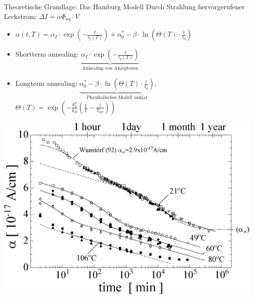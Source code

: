 \documentclass[aspectratio=43, 10pt]{beamer}
\begin{document}
\begin{frame}{Theoretische Grundlage: Das Hamburg Modell}
  Durch Strahlung hervorgerufener Leckstrom: \:$\Delta I = \alpha \Phi_{\mathrm{eq}} \cdot V $ \\
  \medskip

  \begin{itemize}
    \item $\alpha(t, T) = \alpha_I \cdot \exp{\left(-\frac{t}{\tau_{\mathrm{I}}(T)}\right)} + \alpha_{\mathrm{0}}^{*} -\beta \cdot \ln{\left(\Theta(T) \cdot \frac{t}{t_{\mathrm{0}}}\right)}$
    \medskip
    \item Shortterm annealing:\: $\underbrace{\alpha_I \cdot \exp{\left(-\frac{t}{\tau_{\mathrm{I}}(T)}\right)}}_{\text{Annealing von Akzeptoren}}$
    \item Longterm annealing:\: $\underbrace{\alpha_{\mathrm{0}}^{*} -\beta \cdot \ln{\left(\Theta(T) \cdot \frac{t}{t_{\mathrm{0}}}\right)}}_{\text{Physikalisches Modell unklar}}$, \: $\Theta(T) =  \exp{\left(-\frac{E_{\mathrm{I}}^*}{k_B}\left(\frac{1}{T}-\frac{1}{T_{\mathrm{ref}}}\right)\right)}$


  \end{itemize}
  \medskip
  \hfill
  \begin{minipage}[b]{0.35\linewidth}
    \vspace{-0.1cm} \hspace{-5cm}
  \includegraphics[height=8.3\baselineskip]{images/damage_4_3.png}
  \end{minipage}
\end{frame}
\end{document}
